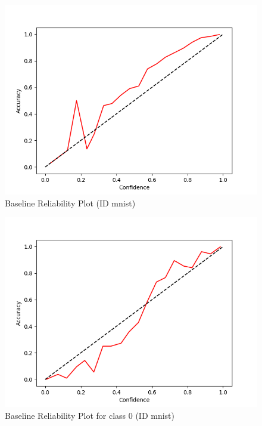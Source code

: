 \documentclass[11pt]{article}
\begin{document}
\begin{figure}[htbp]
\centering
\includegraphics[width=.9\linewidth]{./base_mnist_total_rel.png}
\caption{\label{fig:orgcf4aed6}
Baseline Reliability Plot (ID mnist)}
\end{figure}

\begin{figure}[htbp]
\centering
\includegraphics[width=.9\linewidth]{./base_mnist_rel_0.png}
\caption{\label{fig:org48426c1}
Baseline Reliability Plot for class 0 (ID mnist)}
\end{figure}
\end{document}

